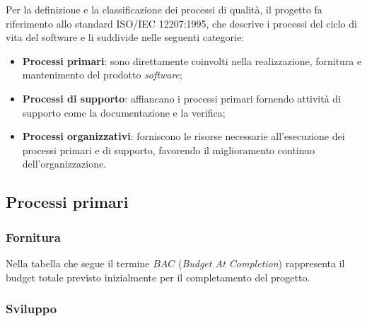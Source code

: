 \documentclass[10pt, letterpaper]{article}
\begin{document}
Per la definizione e la classificazione dei processi di qualità, il progetto
fa riferimento allo standard ISO/IEC 12207:1995, che descrive i processi
del ciclo di vita del software e li suddivide nelle seguenti categorie:
\begin{itemize}
    \item \textbf{Processi primari}: sono direttamente coinvolti nella
          realizzazione, fornitura e mantenimento del prodotto \textit{software};
    \item \textbf{Processi di supporto}: affiancano i processi primari fornendo
          attività di supporto come la documentazione e la verifica;
    \item \textbf{Processi organizzativi}: forniscono le risorse necessarie
          all'esecuzione dei processi primari e di supporto, favorendo il
          miglioramento continuo dell'organizzazione.
\end{itemize}
\subsection{Processi primari}
\subsubsection{Fornitura}
Nella tabella che segue il termine $BAC$ (\textit{Budget At Completion})
rappresenta il budget totale previsto inizialmente per il completamento
del progetto.
\begin{table}[H]
    \caption{Tabella dei valori soglia per metriche di fornitura}
\end{table}

\begin{table}[H]
    \subsubsection{Sviluppo}
    \caption{Tabella dei valori soglia per metriche di sviluppo}
\end{table}
\end{document}
